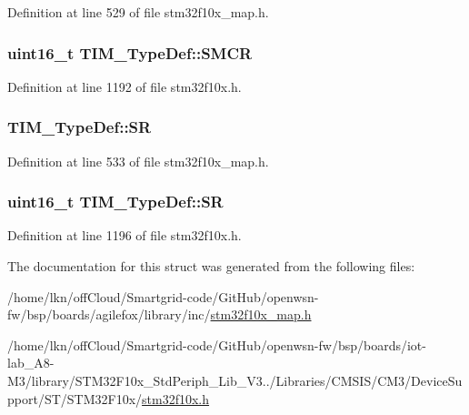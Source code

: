 Definition at line 529 of file stm32f10x\+\_\+map.\+h.

\subsubsection[{\texorpdfstring{S\+M\+CR}{SMCR}}]{ {\bf uint16\+\_\+t} T\+I\+M\+\_\+\+Type\+Def\+::\+S\+M\+CR}\hypertarget{struct_t_i_m___type_def_a476012f1b4567ffc21ded0b5fd50985e}{}\label{struct_t_i_m___type_def_a476012f1b4567ffc21ded0b5fd50985e}


Definition at line 1192 of file stm32f10x.\+h.

\subsubsection[{\texorpdfstring{SR}{SR}}]{ T\+I\+M\+\_\+\+Type\+Def\+::\+SR}\hypertarget{struct_t_i_m___type_def_a7fa587c76679f96d27c91953b1ae307f}{}\label{struct_t_i_m___type_def_a7fa587c76679f96d27c91953b1ae307f}


Definition at line 533 of file stm32f10x\+\_\+map.\+h.

\subsubsection[{\texorpdfstring{SR}{SR}}]{ {\bf uint16\+\_\+t} T\+I\+M\+\_\+\+Type\+Def\+::\+SR}\hypertarget{struct_t_i_m___type_def_af686e22c1792dc59dfeffe451d47cf13}{}\label{struct_t_i_m___type_def_af686e22c1792dc59dfeffe451d47cf13}


Definition at line 1196 of file stm32f10x.\+h.



The documentation for this struct was generated from the following files\+:\begin{DoxyCompactItemize}
\item 
/home/lkn/off\+Cloud/\+Smartgrid-\/code/\+Git\+Hub/openwsn-\/fw/bsp/boards/agilefox/library/inc/\hyperlink{agilefox_2library_2inc_2stm32f10x__map_8h}{stm32f10x\+\_\+map.\+h}\item 
/home/lkn/off\+Cloud/\+Smartgrid-\/code/\+Git\+Hub/openwsn-\/fw/bsp/boards/iot-\/lab\+\_\+\+A8-\/\+M3/library/\+S\+T\+M32\+F10x\+\_\+\+Std\+Periph\+\_\+\+Lib\+\_\+\+V3../\+Libraries/\+C\+M\+S\+I\+S/\+C\+M3/\+Device\+Support/\+S\+T/\+S\+T\+M32\+F10x/\hyperlink{iot-lab___a8-_m3_2library_2_s_t_m32_f10x___std_periph___lib___v3_85_80_2_libraries_2_c_m_s_i_s_26497265545392eb5694b064ae15018db}{stm32f10x.\+h}\end{DoxyCompactItemize}
